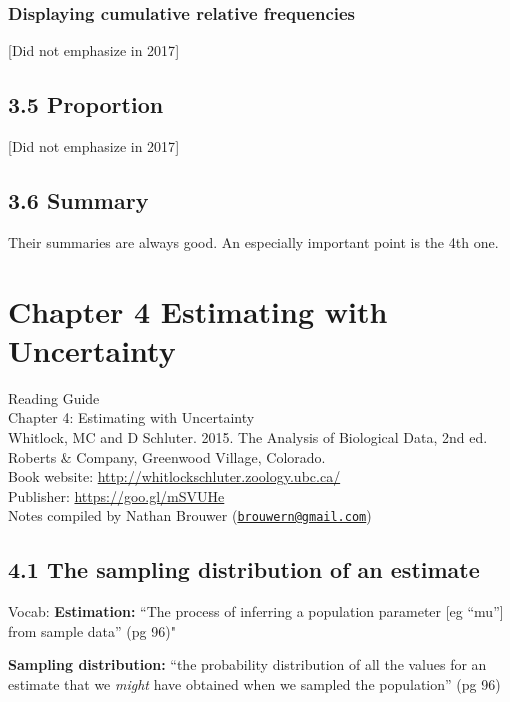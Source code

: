 \documentclass[]{book}
\theoremstyle{definition}
\theoremstyle{definition}
\theoremstyle{definition}
\theoremstyle{remark}
\begin{document}
\subsection{Displaying cumulative relative
frequencies}\label{displaying-cumulative-relative-frequencies}

{[}Did not emphasize in 2017{]}

\section{3.5 Proportion}\label{proportion}

{[}Did not emphasize in 2017{]}

\section{3.6 Summary}\label{summary-2}

Their summaries are always good. An especially important point is the
4th one.

\chapter{Chapter 4 Estimating with
Uncertainty}\label{chapter-4-estimating-with-uncertainty}

Reading Guide\\
Chapter 4: Estimating with Uncertainty\\
Whitlock, MC and D Schluter. 2015. The Analysis of Biological Data, 2nd
ed. Roberts \& Company, Greenwood Village, Colorado.\\
Book website: \url{http://whitlockschluter.zoology.ubc.ca/}\\
Publisher: \url{https://goo.gl/mSVUHe}\\
Notes compiled by Nathan Brouwer
(\href{mailto:brouwern@gmail.com}{\nolinkurl{brouwern@gmail.com}})

\section{4.1 The sampling distribution of an
estimate}\label{the-sampling-distribution-of-an-estimate}

Vocab: \textbf{Estimation:} ``The process of inferring a population
parameter {[}eg ``mu''{]} from sample data'' (pg 96)"

\textbf{Sampling distribution:} ``the probability distribution of all
the values for an estimate that we \emph{might} have obtained when we
sampled the population'' (pg 96)
\end{document}
